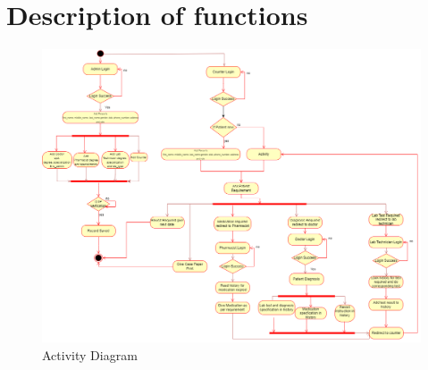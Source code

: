 \section{Description of functions} 
\begin{figure}[h!]
    \centering
    \includegraphics[width=1.1\textwidth]{activity.png}
    \caption{Activity Diagram}
\end{figure}

